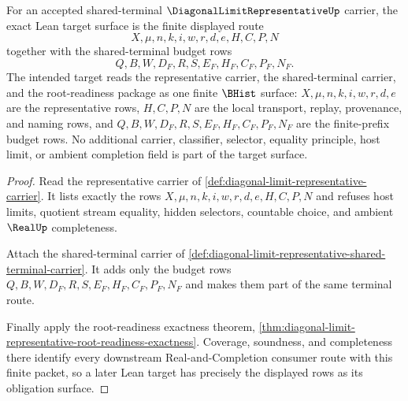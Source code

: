 \begin{theorem}
\label{thm:diagonal-limit-representative-lean-target-surface}
For an accepted shared-terminal $\DiagonalLimitRepresentativeUp$ carrier, the exact Lean target surface is the finite displayed route
$$
X,\mu,n,k,i,w,r,d,e,H,C,P,N
$$
together with the shared-terminal budget rows
$$
Q,B,W,D_F,R,S,E_F,H_F,C_F,P_F,N_F.
$$
The intended target reads the representative carrier, the shared-terminal carrier, and the root-readiness package as one finite $\BHist$ surface: $X,\mu,n,k,i,w,r,d,e$ are the representative rows, $H,C,P,N$ are the local transport, replay, provenance, and naming rows, and $Q,B,W,D_F,R,S,E_F,H_F,C_F,P_F,N_F$ are the finite-prefix budget rows. No additional carrier, classifier, selector, equality principle, host limit, or ambient completion field is part of the target surface.
\end{theorem}
\begin{proof}
Read the representative carrier of \autoref{def:diagonal-limit-representative-carrier}. It lists exactly the rows $X,\mu,n,k,i,w,r,d,e,H,C,P,N$ and refuses host limits, quotient stream equality, hidden selectors, countable choice, and ambient $\RealUp$ completeness.

Attach the shared-terminal carrier of \autoref{def:diagonal-limit-representative-shared-terminal-carrier}. It adds only the budget rows $Q,B,W,D_F,R,S,E_F,H_F,C_F,P_F,N_F$ and makes them part of the same terminal route.

Finally apply the root-readiness exactness theorem, \autoref{thm:diagonal-limit-representative-root-readiness-exactness}. Coverage, soundness, and completeness there identify every downstream Real-and-Completion consumer route with this finite packet, so a later Lean target has precisely the displayed rows as its obligation surface.
\end{proof}

